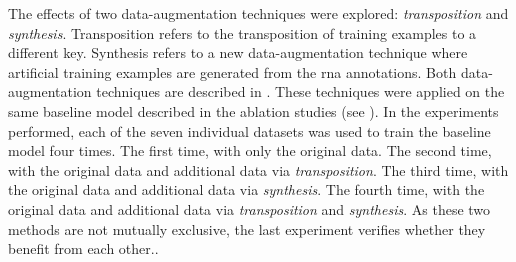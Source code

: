 
The effects of two data-augmentation techniques were
explored: \emph{transposition} and \emph{synthesis}.
Transposition refers to the transposition of training
examples to a different key. Synthesis refers to a new
data-augmentation technique where artificial training
examples are generated from the \gls{rna} annotations. Both
data-augmentation techniques are described in
. These techniques were applied on
the same baseline model described in the ablation studies
(see ). In the experiments
performed, each of the seven individual datasets was used to
train the baseline model four times. The first time, with
only the original data. The second time, with the original
data and additional data via \emph{transposition}. The third
time, with the original data and additional data via
\emph{synthesis}. The fourth time, with the original data
and additional data via \emph{transposition} and
\emph{synthesis}. As these two methods are not mutually
exclusive, the last experiment verifies whether they benefit
from each other..
